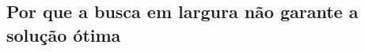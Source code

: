 \documentclass[12pt,a4paper]{article}
\begin{document}

\subsection{Por que a busca em largura não garante a solução ótima}
\label{sec:por-que-bfs}
\end{document}
